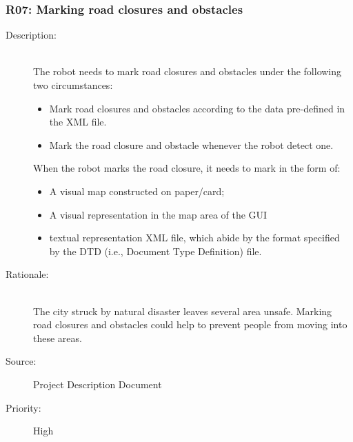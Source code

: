 \documentclass[titlepage]{article}
\begin{document}
\subsubsection{R07: Marking road closures and obstacles }
\begin{description}
\item[Description: ] \hfill \\ The robot needs to mark road closures and obstacles under the following two circumstances:

\begin{itemize}
\item Mark road closures and obstacles according to the data pre-defined in the XML file.
\item Mark the road closure and obstacle whenever the robot detect one.
\end{itemize}

When the robot marks the road closure, it needs to mark in the form of:

\begin{itemize}
\item A visual map constructed on paper/card;
\item A visual representation in the map area of the GUI
\item textual representation XML file, which abide by the format specified by the DTD (i.e., Document Type Definition) file.
\end{itemize}

\item[Rationale: ] \hfill \\The city struck by natural disaster leaves several area unsafe. Marking road closures and obstacles could help to prevent people from moving into these areas.
\item[Source: ] Project Description Document
\item[Priority: ] High
\end{description}
\end{document}
